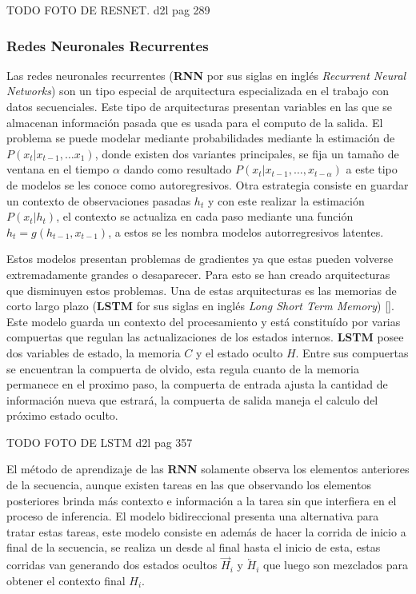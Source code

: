 TODO FOTO DE RESNET. d2l pag 289

\subsubsection{Redes Neuronales Recurrentes}

Las redes neuronales recurrentes (\textbf{RNN} por sus siglas en inglés \emph{Recurrent Neural Networks}) son
un tipo especial de arquitectura especializada en el trabajo con datos secuenciales. Este tipo de arquitecturas
presentan variables en las que se almacenan información pasada que es usada para el computo de la salida. El 
problema se puede modelar mediante probabilidades mediante la estimación de $P(x_t | x_{t-1}, \dots x_{1})$,
donde existen dos variantes principales, se fija un tamaño de ventana en el tiempo $\alpha$ dando como resultado
$P(x_t | x_{t-1}, \dots, x_{t-\alpha})$ a este tipo de modelos se les conoce como autoregresivos. Otra estrategia
consiste en guardar un contexto de observaciones pasadas $h_t$ y con este realizar la estimación $P(x_t | h_t)$,
el contexto se actualiza en cada paso mediante una función $h_t = g(h_{t-1}, x_{t-1})$, a estos se les nombra
modelos autorregresivos latentes. 

Estos modelos presentan problemas de gradientes ya que estas pueden volverse extremadamente grandes o desaparecer.
Para esto se han creado arquitecturas que disminuyen estos problemas. Una de estas arquitecturas es las memorias
de corto largo plazo (\textbf{LSTM} for sus siglas en inglés \emph{Long Short Term Memory}) [\cite{TODO lstm}].
Este modelo guarda un contexto del procesamiento y está constituído por varias compuertas que regulan las 
actualizaciones de los estados internos. \textbf{LSTM} posee dos variables de estado, la memoria $C$ y el estado 
oculto $H$. Entre sus compuertas se encuentran la compuerta de olvido, esta regula cuanto de la memoria permanece
en el proximo paso, la compuerta de entrada ajusta la cantidad de información nueva que estrará, la compuerta 
de salida maneja el calculo del próximo estado oculto.

TODO FOTO DE LSTM d2l pag 357

El método de aprendizaje de las \textbf{RNN} solamente observa los elementos anteriores de la secuencia, aunque existen
tareas en las que observando los elementos posteriores brinda más contexto e información a la tarea sin que interfiera
en el proceso de inferencia. El modelo bidireccional presenta una alternativa para tratar estas tareas, este modelo
consiste en además de hacer la corrida de inicio a final de la secuencia, se realiza un desde al final hasta el  
inicio de esta, estas corridas van generando dos estados ocultos $\overrightarrow{H}_{i}$ y $\overleftarrow{H}_{i}$
que luego son mezclados para obtener el contexto final $H_i$.


